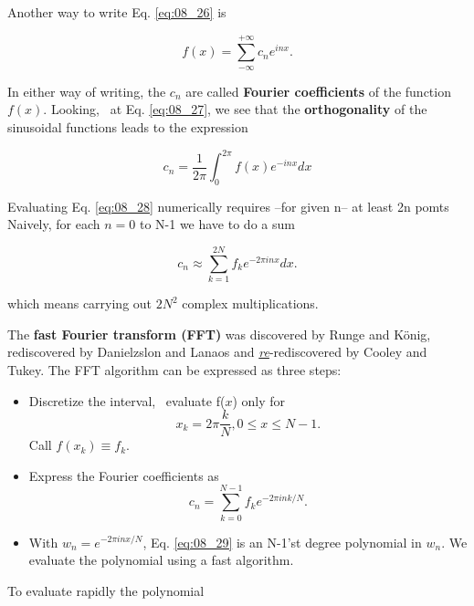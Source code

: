 Another way to write Eq. \ref{eq:08_26} is

\begin{equation}\label{eq:08_27}
f(x) = \sum_{-\infty}^{+\infty} c_{n}e^{inx}.
\end{equation}

In either way of writing, the $c_{n}$ are called \textbf{Fourier coefficients} of the function $f(x)$. Looking, \eg\ at Eq. \ref{eq:08_27}, we see that the \textbf{orthogonality} of the sinusoidal functions leads to the expression

\begin{equation}\label{eq:08_28}
c_{n} = \frac{1}{2\pi}\int_{0}^{2\pi}f(x)e^{-inx}dx
\end{equation}

Evaluating Eq. \ref{eq:08_28} numerically requires --for given n-- at least 2n pomts Naively, for each $n = 0$ to N-1 we have to do a sum

\begin{equation*}
c_{n} \approx \sum_{k=1}^{2N}f_{k}e^{-2\pi inx}dx .
\end{equation*}

which means carrying out $2N^2$ complex multiplications.

The \textbf{fast Fourier transform (FFT)} was discovered by Runge and K\"{o}nig, rediscovered by Danielzslon and Lanaos and \textit{\underline{re}}-rediscovered by Cooley and Tukey. The FFT algorithm can be expressed as three steps:

\begin{itemize}
    \item Discretize the interval, \ie\ evaluate f($x$) only for
    \begin{equation*}
        x_{k} = 2\pi \frac{k}{N} , 0 \leq x \leq N-1.
    \end{equation*}
    Call $f(x_k) \equiv f_k$.
    \item   Express the Fourier coefficients as
    \begin{equation}\label{eq:08_29}
        c_{n} = \sum_{k=0}^{N-1}f_{k}e^{-2\pi ink/N} .
    \end{equation}
    \item With $w_{n} = e^{-2\pi inx/N}$, Eq. \ref{eq:08_29} is an N-1’st degree polynomial in $w_{n}$. We evaluate the polynomial using a fast algorithm.
\end{itemize}

To evaluate rapidly the polynomial

